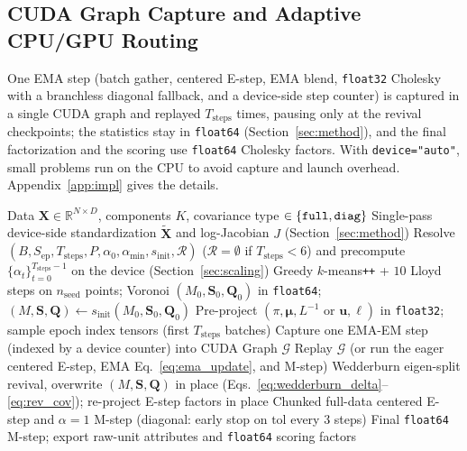 \documentclass[10pt]{article} %
\newcommand{\egmm}{\textsc{e-GMM}}
\newcommand{\R}{\mathbb{R}}
\begin{document}
\subsection{CUDA Graph Capture and Adaptive CPU/GPU Routing}
\label{sec:systems}

One EMA step (batch gather, centered E-step, EMA blend, \texttt{float32} Cholesky with a branchless diagonal fallback, and a device-side step counter) is captured in a single CUDA graph and replayed $T_{\mathrm{steps}}$ times, pausing only at the revival checkpoints; the statistics stay in \texttt{float64} (Section~\ref{sec:method}), and the final factorization and the scoring use \texttt{float64} Cholesky factors. With \texttt{device="auto"}, small problems run on the CPU to avoid capture and launch overhead. Appendix~\ref{app:impl} gives the details.

\begin{algorithm}[t]
\caption{\egmm{} Training Loop}
\label{alg:egmm}
\let\AND\relax %
\begin{algorithmic}[1]
\REQUIRE Data $\mathbf{X} \in \R^{N\times D}$, components $K$, covariance type $\in \{\text{\texttt{full}}, \text{\texttt{diag}}\}$
\STATE Single-pass device-side standardization $\tilde{\mathbf{X}}$ and log-Jacobian $J$ (Section~\ref{sec:method})
\STATE Resolve $(B, S_{\mathrm{ep}}, T_{\mathrm{steps}}, P, \alpha_0, \alpha_{\min}, s_{\mathrm{init}}, \mathcal{R})$ ($\mathcal{R} = \emptyset$ if $T_{\mathrm{steps}} < 6$) and precompute $\{\alpha_t\}_{t=0}^{T_{\mathrm{steps}}-1}$ on the device (Section~\ref{sec:scaling})
\STATE Greedy $k$-means\texttt{++} + $10$ Lloyd steps on $n_{\mathrm{seed}}$ points; Voronoi $(M_0, \mathbf{S}_0, \mathbf{Q}_0)$ in \texttt{float64}; $(M, \mathbf{S}, \mathbf{Q}) \leftarrow s_{\mathrm{init}}(M_0, \mathbf{S}_0, \mathbf{Q}_0)$
\STATE Pre-project $(\pi, \boldsymbol{\mu}, L^{-1}\text{ or }\mathbf{u}, \ell)$ in \texttt{float32}; sample epoch index tensors (first $T_{\mathrm{steps}}$ batches)
  \STATE Capture one EMA-EM step (indexed by a device counter) into CUDA Graph $\mathcal{G}$
\ENDIF
{}
  \STATE Replay $\mathcal{G}$ (or run the eager centered E-step, EMA Eq.~\eqref{eq:ema_update}, and M-step)
    \STATE Wedderburn eigen-split revival, overwrite $(M, \mathbf{S}, \mathbf{Q})$ in place (Eqs.~\eqref{eq:wedderburn_delta}--\eqref{eq:rev_cov}); re-project E-step factors in place
  \ENDIF
\ENDFOR
{}
  \STATE Chunked full-data centered E-step and $\alpha = 1$ M-step (diagonal: early stop on $\mathrm{tol}$ every 3 steps)
\ENDFOR
\STATE Final \texttt{float64} M-step; export raw-unit attributes and \texttt{float64} scoring factors
\end{algorithmic}
\end{algorithm}
\end{document}
